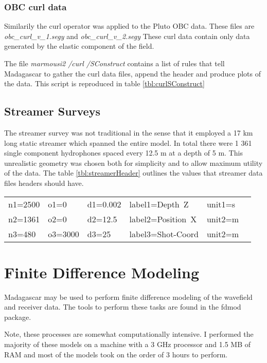 {
\tiny

\normalsize
}



\subsubsection{OBC curl data}
Similarily the curl operator was applied to the Pluto OBC data.  These files are \emph{obc\_curl\_v\_1.segy} and \emph{
obc\_curl\_v\_2.segy}  These curl data contain only data generated by the elastic component of the field.  

The file \emph{marmousi2 \slash curl \slash SConstruct} contains a list of rules that tell Madagascar to gather the 
curl data files, append the header and produce plots of the data.  This script is reproduced 
in table \ref{tbl:curlSConstruct}
{
\tiny

\normalsize
}

\subsection{Streamer Surveys}
The streamer survey was not traditional in the sense that it employed a 17 km long static streamer which spanned the entire
model.  In total there were 1 361 single component hydrophones spaced every 12.5 m at a depth of 5 m.  This unrealistic geometry
was chosen both for simplicity and to allow maximum utility of the data.  The table \ref{tbl:streamerHeader} outlines the 
values that streamer data files headers should have.    

{
\begin{tabular}[t]{|llllll|}
        \hline
        n1=2500    &   o1=0     &   d1=0.002    &    label1=Depth\ Z     &  unit1=s  &  \\
        n2=1361    &   o2=0     &   d2=12.5     &    label2=Position\ X  &  unit2=m  &  \\
	n3=480 	   &   o3=3000  &   d3=25	&    label3=Shot-Coord   &  unit2=m  &  \\
        \hline
\end{tabular}
}

\section{Finite Difference Modeling}
Madagascar may be used to perform finite difference modeling of the wavefield and receiver data.  The tools to perform these tasks are
found in the fdmod package.    

Note, these processes are somewhat computationally intensive.  I performed the majority of these models on a machine with a 3 GHz 
processor and 1.5 MB of RAM and most of the models took on the order of 3 hours to perform.     


